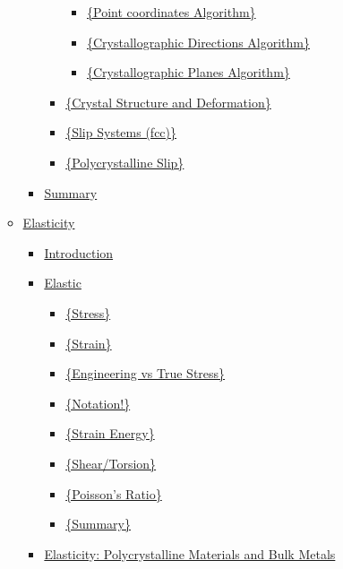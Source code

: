 \documentclass[
]{article}
\providecommand{\tightlist}{%
  \setlength{\itemsep}{0pt}\setlength{\parskip}{0pt}}
\begin{document}
\begin{itemize}
\begin{itemize}
\begin{itemize}
\begin{itemize}
        \begin{itemize}
        \tightlist
        \item
          \protect\hyperlink{point-coordinates-algorithm}{\{Point
          coordinates Algorithm\}}
        \item
          \protect\hyperlink{crystallographic-directions-algorithm}{\{Crystallographic
          Directions Algorithm\}}
        \item
          \protect\hyperlink{crystallographic-planes-algorithm}{\{Crystallographic
          Planes Algorithm\}}
        \end{itemize}
      \item
        \protect\hyperlink{crystal-structure-and-deformation}{\{Crystal
        Structure and Deformation\}}
      \item
        \protect\hyperlink{slip-systems-fcc}{\{Slip Systems (fcc)\}}
      \item
        \protect\hyperlink{polycrystalline-slip}{\{Polycrystalline
        Slip\}}
      \end{itemize}
    \item
      \protect\hyperlink{summary}{Summary}
    \end{itemize}
  \item
    \protect\hyperlink{elasticity}{Elasticity}

    \begin{itemize}
    \tightlist
    \item
      \protect\hyperlink{introduction-1}{Introduction}
    \item
      \protect\hyperlink{elastic}{Elastic}

      \begin{itemize}
      \tightlist
      \item
        \protect\hyperlink{stress}{\{Stress\}}
      \item
        \protect\hyperlink{strain}{\{Strain\}}
      \item
        \protect\hyperlink{engineering-vs-true-stress}{\{Engineering vs
        True Stress\}}
      \item
        \protect\hyperlink{notation}{\{Notation!\}}
      \item
        \protect\hyperlink{strain-energy}{\{Strain Energy\}}
      \item
        \protect\hyperlink{sheartorsion}{\{Shear/Torsion\}}
      \item
        \protect\hyperlink{poissons-ratio}{\{Poisson's Ratio\}}
      \item
        \protect\hyperlink{summary-1}{\{Summary\}}
      \end{itemize}
    \item
      \protect\hyperlink{elasticity-polycrystalline-materials-and-bulk-metals}{Elasticity:
      Polycrystalline Materials and Bulk Metals}


\end{itemize}
\end{itemize}
\end{itemize}
\end{document}
